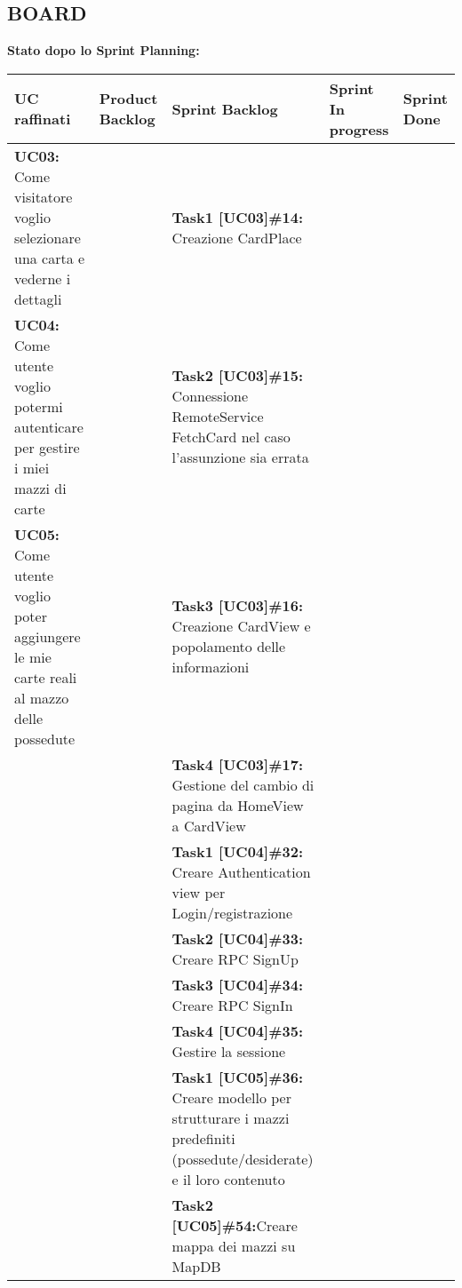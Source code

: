 \documentclass{article}
\begin{document}
    \begin{itemize}
        \newpage
        \subsection{BOARD}
        \textbf{Stato dopo lo Sprint Planning:}
        \newline
        \newline
        \begin{tabular}{ | p{3.5cm} | p{1.5cm} | p{5cm} | p{1.6cm} | p{1.6cm} | }
            \hline
            \textbf{UC raffinati}
            & \textbf{Product Backlog}
            & \textbf{Sprint Backlog}
            & \textbf{Sprint In progress}
            & \textbf{Sprint Done} \\
            \hline
            \textbf{UC03:}  Come visitatore voglio selezionare una carta e vederne i dettagli
            & & \textbf{Task1 [UC03]\#14:} Creazione CardPlace & & \\
            \hline
            \textbf{UC04:}  Come utente voglio potermi autenticare per gestire i miei mazzi di carte
            & & \textbf{Task2 [UC03]\#15:} Connessione RemoteService FetchCard nel caso l'assunzione sia errata & & \\
            \hline
            \textbf{UC05:}  Come utente voglio poter aggiungere le mie carte reali al mazzo delle possedute
            & & \textbf{Task3 [UC03]\#16:} Creazione CardView e popolamento delle informazioni & & \\
            \hline
            & & \textbf{Task4 [UC03]\#17:} Gestione del cambio di pagina da HomeView a CardView & & \\
            \hline
            & & \textbf{Task1 [UC04]\#32:} Creare Authentication view per Login/registrazione  & & \\
            \hline
            & & \textbf{Task2 [UC04]\#33:} Creare RPC SignUp & & \\
            \hline
            & & \textbf{Task3 [UC04]\#34:} Creare RPC SignIn  & & \\
            \hline
            & & \textbf{Task4 [UC04]\#35:} Gestire la sessione  & & \\
            \hline
            & & \textbf{Task1 [UC05]\#36:} Creare modello per strutturare i mazzi predefiniti (possedute/desiderate) e il loro contenuto  & & \\
            \hline
            & & \textbf{Task2 [UC05]\#54:}Creare mappa dei mazzi su MapDB  & & \\

\end{tabular}
\end{itemize}
\end{document}
